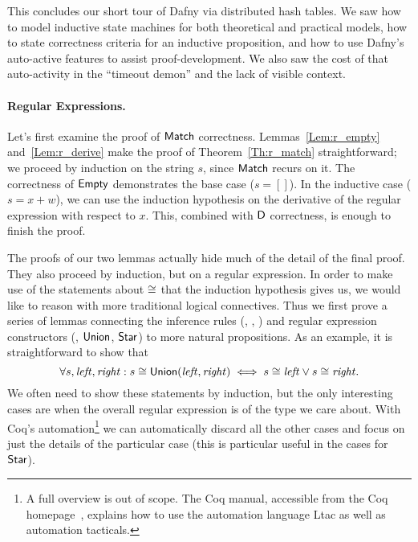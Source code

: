 This concludes our short tour of Dafny via distributed hash tables. We saw how
to model inductive state machines for both theoretical and practical models, how
to state correctness criteria for an inductive proposition, and how to use
Dafny's auto-active features to assist proof-development. We also saw the cost
of that auto-activity in the ``timeout demon'' and the lack of visible context.

\paragraph{Regular Expressions.} Let's first examine the proof of
\(\mathsf{Match}\) correctness. Lemmas~\ref{Lem:r_empty} and~\ref{Lem:r_derive}
make the proof of Theorem~\ref{Th:r_match} straightforward; we proceed by
induction on the string \(s\), since \(\mathsf{Match}\) recurs on it. The
correctness of \(\mathsf{Empty}\) demonstrates the base case (\(s = []\)). In the
inductive case (\(s = x + w\)), we can use the induction hypothesis on the
derivative of the regular expression with respect to \(x\). This, combined with
\(\mathsf{D}\) correctness, is enough to finish the proof.

The proofs of our two lemmas actually hide much of the detail of the final
proof. They also proceed by induction, but on a regular expression. In order to
make use of the statements about \(\mathrel{\cong}\) that the induction hypothesis
gives us, we would like to reason with more traditional logical connectives.
Thus we first prove a series of lemmas connecting the inference rules (\eg,
, ) and regular expression constructors (\eg,
\(\mathsf{Union}\), \(\mathsf{Star}\)) to more natural propositions. As an example,
it is straightforward to show that
\begin{equation*}
    \forall s, \mathit{left}, \mathit{right}:
    s \mathrel{\cong} \mathsf{Union}(\mathit{left}, \mathit{right})
    \iff
    s \mathrel{\cong} \mathit{left} \lor s \mathrel{\cong} \mathit{right}.
\end{equation*}
We often need to show these statements by induction, but the only interesting
cases are when the overall regular expression is of the type we care about. With
Coq's automation\footnote{A full overview is out of scope. The Coq manual,
accessible from the Coq homepage~\cite{Coq}, explains how to use the automation
language Ltac as well as automation tacticals.} we can automatically discard
all the other cases and focus on just the details of the particular case (this
is particular useful in the cases for \(\mathsf{Star}\)).

